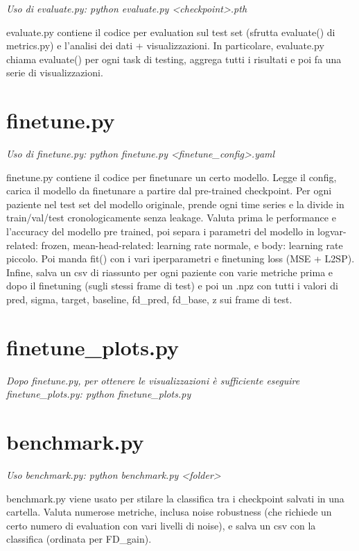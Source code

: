 \documentclass[11pt]{article}
\newcommand{\nota}[1]{{\itshape\color{gray!60!black} #1}\par}
\begin{document}
\nota{Uso di evaluate.py: python evaluate.py <checkpoint>.pth}

evaluate.py contiene il codice per evaluation sul test set (sfrutta evaluate() di metrics.py) e l'analisi dei dati + visualizzazioni. In particolare, evaluate.py chiama evaluate() per ogni task di testing, aggrega tutti i risultati e poi fa una serie di visualizzazioni.

\section{finetune.py}

\nota{Uso di finetune.py: python finetune.py <finetune\_config>.yaml}

finetune.py contiene il codice per finetunare un certo modello. Legge il config, carica il modello da finetunare a partire dal pre-trained checkpoint. Per ogni paziente nel test set del modello originale, prende ogni time series e la divide in train/val/test cronologicamente senza leakage. Valuta prima le performance e l'accuracy del modello pre trained, poi separa i parametri del modello in logvar-related: frozen, mean-head-related: learning rate normale, e body: learning rate piccolo. Poi manda fit() con i vari iperparametri e finetuning loss (MSE + L2SP). Infine, salva un csv di riassunto per ogni paziente con varie metriche prima e dopo il finetuning (sugli stessi frame di test) e poi un .npz con tutti i valori di pred, sigma, target, baseline, fd\_pred, fd\_base, z sui frame di test.

\section{finetune\_plots.py}

\nota{Dopo finetune.py, per ottenere le visualizzazioni è sufficiente eseguire finetune\_plots.py: python finetune\_plots.py}

\section{benchmark.py}

\nota{Uso benchmark.py: python benchmark.py <folder>}

benchmark.py viene usato per stilare la classifica tra i checkpoint salvati in una cartella. Valuta numerose metriche, inclusa noise robustness (che richiede un certo numero di evaluation con vari livelli di noise), e salva un csv con la classifica (ordinata per FD\_gain).
\end{document}
